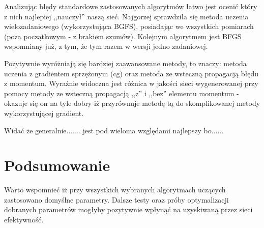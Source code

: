 \documentclass[a4paper]{article}
\begin{document}
Analizując błędy standardowe zastosowanych algorytmów łatwo jest ocenić który z nich
najlepiej ,,nauczył'' naszą sieć. Najgorzej sprawdziła się metoda uczenia wielozadaniowego (wykorzystująca BGFS),
posiadając we wszystkich pomiarach (poza początkowym - z brakiem szumów). Kolejnym algorytmem jest BFGS wspomniany już,
z tym, że tym razem w wersji jedno zadaniowej.

Pozytywnie wyróżniają się bardziej zaawansowane metody, to znaczy: metoda uczenia z gradientem sprzężonym (cg) oraz 
metoda ze wsteczną propagacją błędu z momentum. Wyraźnie widoczna jest różnica w jakości sieci wygenerowanej przy pomocy 
metody ze wsteczną propagacją ,,z'' i ,,bez'' elementu momentum - okazuje się on na tyle dobry iż przyrównuje metodę tą do 
skomplikowanej metody wykorzystującej gradient.


Widać że generalnie....... jest pod wieloma względami najlepszy bo......

\section{Podsumowanie}
Warto wspomnieć iż przy wszystkich wybranych algorytmach uczących zastosowano domyślne parametry. 
Dalsze testy oraz próby optymalizacji dobranych parametrów mogłyby pozytywnie wpłynąć na uzyskiwaną przez sieci efektywność.
\end{document}
